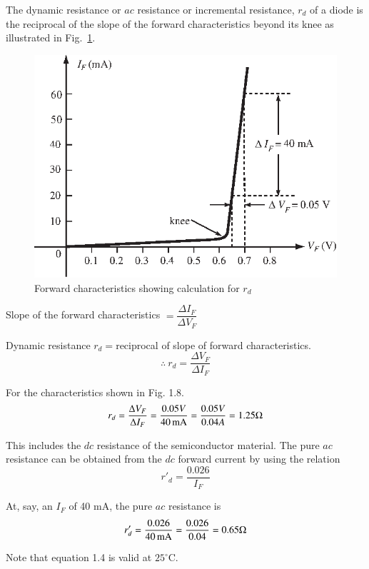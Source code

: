 The dynamic resistance or $ac$ resistance or incremental resistance,
$r_d$ of a diode is the reciprocal of the slope of the forward
characteristics beyond its knee as illustrated in Fig.~\ref{fig1.8}.
\begin{figure}[H]
\centering
\includegraphics[scale=1.1]{chap1/S3-EE-01-013.eps}
\caption{Forward characteristics showing calculation for $r_{d}$}\label{fig1.8}
\end{figure}

Slope of the forward characteristics $= \dfrac{\Delta I_F}{\Delta
  V_F}$

Dynamic resistance $r_d = $reciprocal of slope of forward
characteristics.
\begin{equation}
\therefore ~ r_d = \frac{\Delta V_F}{\Delta I_F} \label{eq1.3}
\end{equation}

For the characteristics shown in Fig. 1.8.
$$
r_d = \frac{\Delta V_F}{\Delta I_F} = \frac{0.05 V}{40 \operatorname{mA}} =
\frac{0.05 V}{0.04 A} = 1.25 \Omega
$$

This includes the $dc$ resistance of the semiconductor material. The
pure $ac$ resistance can be obtained from the $dc$ forward current by
using the relation
\begin{equation}
r'_d = \frac{0.026}{I_F} \label{eq1.4}
\end{equation}

At, say, an $I_F$ of 40 mA, the pure $ac$ resistance is 
$$
r'_d = \frac{0.026}{40 \operatorname{mA}} = \frac{0.026}{0.04} = 0.65 \Omega
$$

Note that equation 1.4 is valid at $25^\circ$C. 

